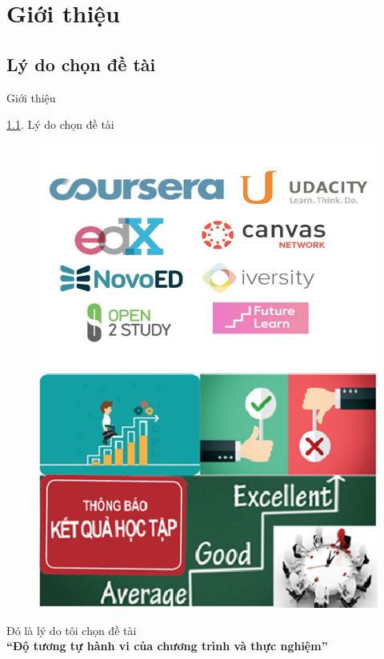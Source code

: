 \section{Giới thiệu}
\label{sec:Gioithieu}
\subsection{Lý do chọn đề tài}
\label{subsec:LDCDT}
\begin{frame}{Giới thiệu}
\begin{block}{\ref{subsec:LDCDT}. Lý do chọn đề tài}
\begin{figure}[h]
\centering
\includegraphics[width=0.4\linewidth]{images/topMOOC.png}
\pause
\includegraphics[width=0.4\linewidth]{images/Retry.png}
\end{figure}
\pause
\centering
Đó là lý do tôi chọn đề tài 
\\ \textbf{ “Độ tương tự hành vi của chương trình và thực nghiệm”}
\end{block}
\end{frame}

